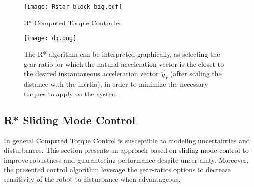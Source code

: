 \begin{figure}[t]
	\centering
		\texttt{[image: Rstar\_block\_big.pdf]}
	\caption{R* Computed Torque Controller}
	\label{fig:Rstar_block_big}
\end{figure}

\begin{figure}[htp]
	\centering
		\texttt{[image: dq.png]}
	\caption[R* algorithm graphical interpretation]{The R* algorithm can be interpreted graphically, as selecting the gear-ratio for which the natural acceleration vector is the closet to the desired instantaneous acceleration vector $\vec{\ddot{q}}_r$ (after scaling the distance with the inertia), in order to minimize the necessary torques to apply on the system.}
	\label{fig:dq}
\end{figure}

\subsection{R* Sliding Mode Control}
\label{sec:slidingmode}

In general Computed Torque Control is susceptible to modeling uncertainties and disturbances. This section presents an approach based on sliding mode control to improve robustness and guaranteeing performance despite uncertainty. Moreover, the presented control algorithm leverage the gear-ratios options to decrease sensitivity of the robot to disturbance when advantageous. 

